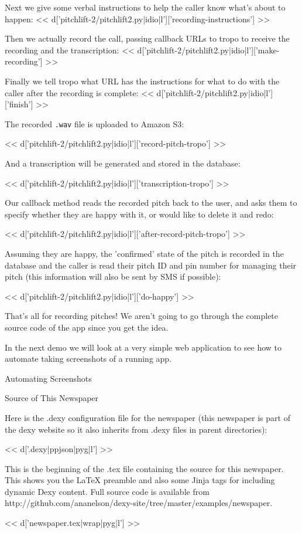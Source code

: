 \documentclass[custom, plainsections]{sciposter}
\begin{document}
\begin{multicols*}{2}
Next we give some verbal instructions to help the caller know what's about to happen:
<< d['pitchlift-2/pitchlift2.py|idio|l']['recording-instructions'] >>

Then we actually record the call, passing callback URLs to tropo to receive the recording and the transcription:
<< d['pitchlift-2/pitchlift2.py|idio|l']['make-recording'] >>

Finally we tell tropo what URL has the instructions for what to do with the caller after the recording is complete:
<< d['pitchlift-2/pitchlift2.py|idio|l']['finish'] >>

The recorded \verb|.wav| file is uploaded to Amazon S3:

<< d['pitchlift-2/pitchlift2.py|idio|l']['record-pitch-tropo'] >>

And a transcription will be generated and stored in the database:

<< d['pitchlift-2/pitchlift2.py|idio|l']['transcription-tropo'] >>

Our callback method reads the recorded pitch back to the user, and asks them to specify whether they are happy with it, or would like to delete it and redo:

<< d['pitchlift-2/pitchlift2.py|idio|l']['after-record-pitch-tropo'] >>

Assuming they are happy, the 'confirmed' state of the pitch is recorded in the database and the caller is read their pitch ID and pin number for managing their pitch (this information will also be sent by SMS if possible):

<< d['pitchlift-2/pitchlift2.py|idio|l']['do-happy'] >>

That's all for recording pitches! We aren't going to go through the complete source code of the app since you get the idea.

In the next demo we will look at a very simple web application to see how to automate taking screenshots of a running app.

\vspace{5pt}

\large
Automating Screenshots
\small

\pagebreak

\large
Source of This Newspaper
\small

Here is the .dexy configuration file for the newspaper (this newspaper is part of the dexy website so it also inherits from .dexy files in parent directories):

<< d['.dexy|ppjson|pyg|l'] >>

This is the beginning of the .tex file containing the source for this newspaper. This shows you the LaTeX preamble and also some Jinja tags for including dynamic Dexy content. Full source code is available from http://github.com/ananelson/dexy-site/tree/master/examples/newspaper.

<< d['newspaper.tex|wrap|pyg|l'] >>

\end{multicols*}
\end{document}
